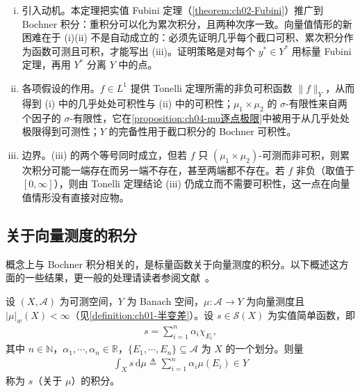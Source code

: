 \documentclass[../../main.tex]{subfiles}%
\begin{document}
\begin{remark}\label{remark:ch04-Fubini动机}
\begin{enumerate}[(i)]
\item 引入动机。本定理把实值 Fubini 定理（\cref{theorem:ch02-Fubini}）推广到 Bochner 积分：重积分可以化为累次积分，且两种次序一致。向量值情形的新困难在于 (i)(ii) 不是自动成立的：必须先证明几乎每个截口可积、累次积分作为函数可测且可积，才能写出 (iii)。证明策略是对每个 $y^*\in Y^*$ 用标量 Fubini 定理，再用 $Y^*$ 分离 $Y$ 中的点。

\item 各项假设的作用。$f\in L^1$ 提供 Tonelli 定理所需的非负可积函数 $\|f\|_Y$，从而得到 (i) 中的几乎处处可积性与 (ii) 中的可积性；$\mu_1\times\mu_2$ 的 $\sigma$-有限性来自两个因子的 $\sigma$-有限性，它在\cref{proposition:ch04-mu逐点极限}中被用于从几乎处处极限得到可测性；$Y$ 的完备性用于截口积分的 Bochner 可积性。

\item 边界。(iii) 的两个等号同时成立，但若 $f$ 只 $(\mu_1\times\mu_2)$-可测而非可积，则累次积分可能一端存在而另一端不存在，甚至两端都不存在。若 $f$ 非负（取值于 $[0,\infty]$），则由 Tonelli 定理结论 (iii) 仍成立而不需要可积性，这一点在向量值情形没有直接对应物。
\end{enumerate}
\end{remark}

\subsection{关于向量测度的积分}\label{subsection:ch04-向量测度积分}\label{subsection:ch04-带号测度积分}

概念上与 Bochner 积分相关的，是标量函数关于向量测度的积分。以下概述这方面的一些结果，更一般的处理请读者参阅文献~\cite{ref41}。

\begin{definition}\label{definition:ch04-向量测度积分}
设 $(X,\mathcal{A})$ 为可测空间，$Y$ 为 Banach 空间，$\mu:\mathcal{A}\to Y$ 为向量测度且 $|\mu|_w(X)<\infty$（见\cref{definition:ch01-半变差}）。设 $s\in\mathcal{S}(X)$ 为实值简单函数，即
\begin{align*}
s=\sum_{i=1}^n\alpha_i\chi_{E_i},
\end{align*}
其中 $n\in\mathbb{N}$，$\alpha_1,\cdots ,\alpha_n\in\mathbb{R}$，$\{E_1,\cdots ,E_n\}\subseteq\mathcal{A}$ 为 $X$ 的一个划分。则量
\begin{align}
\int_X s\,\mathrm{d}\mu\triangleq \sum_{i=1}^n\alpha_i\mu(E_i)\in Y \label{align:ch04-4.56}
\end{align}
称为 $s$（关于 $\mu$）的积分。
\end{definition}
\end{document}
